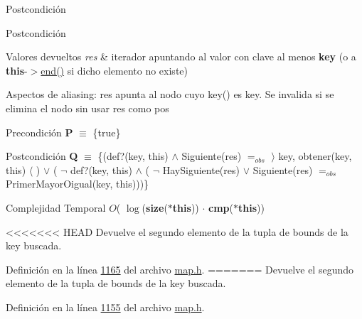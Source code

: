 \begin{DoxyPostcond}{\-Postcondición}
\begin{DoxyPostcond}{\-Postcondición}
\begin{DoxyRetVals}{Valores devueltos}
{\em res} & iterador apuntando al valor con clave al menos {\bfseries key} (o a {\bfseries this}-\/$>$\hyperlink{classaed2_1_1map_a76023e6a56cb625513e1b5ea028bf983_a76023e6a56cb625513e1b5ea028bf983}{end()} si dicho elemento no existe)\\
\hline
\end{DoxyRetVals}
\begin{DoxyParagraph}{Aspectos de aliasing\+:}
res apunta al nodo cuyo key() es key. Se invalida si se elimina el nodo sin usar res como pos
\end{DoxyParagraph}
\begin{DoxyPrecond}{Precondición}
{\bfseries P} $\equiv$ \{true\} 
\end{DoxyPrecond}
\begin{DoxyPostcond}{Postcondición}
{\bfseries Q} $\equiv$ \{(def?(key, this) $\land$ Siguiente(res) $=_{obs}$ $\rangle$ key, obtener(key, this) $\langle$ ) $\lor$ ( $\lnot$ def?(key, this) $\land$ ( $\lnot$ Hay\+Siguiente(res) $\lor$ Siguiente(res) $=_{obs}$ Primer\+Mayor\+Oigual(key, this)))\}
\end{DoxyPostcond}

\begin{DoxyDescription}
\item[Complejidad Temporal]$O$( $\log$({\bfseries size}({\bfseries $\ast$this})) $\cdot$ {\bfseries cmp}({\bfseries $\ast$this}))
\end{DoxyDescription}

<<<<<<< HEAD
\-Devuelve el segundo elemento de la tupla de bounds de la key buscada. 

\-Definición en la línea \hyperlink{map_8h_source_l01165}{1165} del archivo \hyperlink{map_8h_source}{map.\-h}.
=======
Devuelve el segundo elemento de la tupla de bounds de la key buscada. 

Definición en la línea \hyperlink{map_8h_source_l01155}{1155} del archivo \hyperlink{map_8h_source}{map.\+h}.

\mbox{\label{classaed2_1_1map_a07b3dd65557c59ee085e5f211269c6b3_a07b3dd65557c59ee085e5f211269c6b3}} 

\end{DoxyPostcond}
\end{DoxyPostcond}
